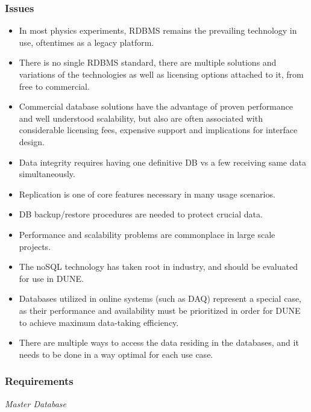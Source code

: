 \subsubsection{Issues}
\begin{itemize}
\item In most physics experiments, RDBMS remains the prevailing technology in use, oftentimes as a legacy platform.
\item There is no single RDBMS standard, there are multiple solutions and variations of the technologies as well as licensing options attached to it, from free to commercial.
\item Commercial database solutions have the advantage of proven performance and well understood scalability, but also are often associated with considerable licensing fees, expensive support and implications for interface design.
\item Data  integrity requires having one definitive DB vs a few receiving same data simultaneously.
\item Replication is one of core features necessary in many usage scenarios.
\item DB backup/restore procedures are needed to protect crucial data.
\item Performance and scalability problems are commonplace in large scale projects.
\item The noSQL technology has taken root in industry, and should be evaluated for use in DUNE.
\item Databases utilized in online systems (such as DAQ) represent a special case, as their performance and availability must be prioritized in order for DUNE to achieve maximum data-taking efficiency.
\item There are multiple ways to access the data residing in the databases, and it needs to be done in a way optimal for each use case.
\end{itemize}

\subsubsection{Requirements}

\textit{Master Database}

